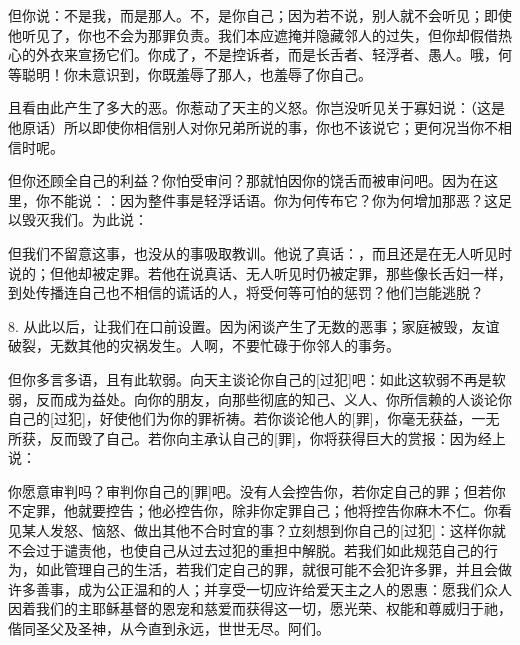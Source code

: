 但你说：不是我，而是那人\Quote{[告诉我的]}。不，是你自己；因为若不说，别人就不会听见；即使他听见了，你也不会为那罪负责。我们本应遮掩并隐藏邻人的过失，但你却假借热心的外衣来宣扬它们。你成了，不是控诉者，而是长舌者、轻浮者、愚人。哦，何等聪明！你未意识到，你既羞辱了那人，也羞辱了你自己。\par

且看由此产生了多大的恶。你惹动了天主的义怒。你岂没听见关于寡妇说：（这是他原话）所以即使你相信别人对你兄弟所说的事，你也不该说它；更何况当你不相信时呢。\par

但你还顾全自己的利益？你怕受审问？那就怕因你的饶舌而被审问吧。因为在这里，你不能说：：因为整件事是轻浮话语。你为何传布它？你为何增加那恶？这足以毁灭我们。为此说：\par

但我们不留意这事，也没从的事吸取教训。他说了真话：，而且还是在无人听见时说的；但他却被定罪。若他在说真话、无人听见时仍被定罪，那些像长舌妇一样，到处传播连自己也不相信的谎话的人，将受何等可怕的惩罚？他们岂能逃脱？\par

8. 从此以后，让我们在口前设置。因为闲谈产生了无数的恶事；家庭被毁，友谊破裂，无数其他的灾祸发生。人啊，不要忙碌于你邻人的事务。\par

但你多言多语，且有此软弱。向天主谈论你自己的[过犯]吧：如此这软弱不再是软弱，反而成为益处。向你的朋友，向那些彻底的知己、义人、你所信赖的人谈论你自己的[过犯]，好使他们为你的罪祈祷。若你谈论他人的[罪]，你毫无获益，一无所获，反而毁了自己。若你向主承认自己的[罪]，你将获得巨大的赏报：因为经上说：\par

你愿意审判吗？审判你自己的[罪]吧。没有人会控告你，若你定自己的罪；但若你不定罪，他就要控告；他必控告你，除非你定罪自己；他将控告你麻木不仁。你看见某人发怒、恼怒、做出其他不合时宜的事？立刻想到你自己的[过犯]：这样你就不会过于谴责他，也使自己从过去过犯的重担中解脱。若我们如此规范自己的行为，如此管理自己的生活，若我们定自己的罪，就很可能不会犯许多罪，并且会做许多善事，成为公正温和的人；并享受一切应许给爱天主之人的恩惠：愿我们众人因着我们的主耶稣基督的恩宠和慈爱而获得这一切，愿光荣、权能和尊威归于祂，偕同圣父及圣神，从今直到永远，世世无尽。阿们。\par

